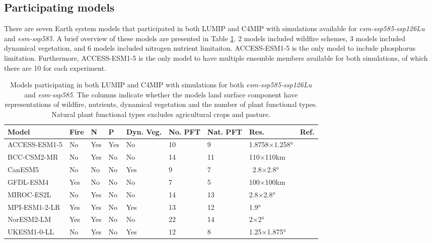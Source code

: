 \documentclass[]{article}
\begin{document}
\subsection{Participating models}

There are seven Earth system models that participated in both LUMIP and C4MIP with simulations available for \textit{esm-ssp585-ssp126Lu} and \textit{esm-ssp585}.
A brief overview of these models are presented in Table \ref{tab:models}.
2 models included wildfire schemes, 3 models included dynamical vegetation, and 6 models included nitrogen nutrient limitaiton.
ACCESS-ESM1-5 is the only model to include phosphorus limitation.
Furthermore, ACCESS-ESM1-5 is the only model to have multiple ensemble members available for both simulations, of which there are 10 for each experiment.

\begin{table}[H]
    \centering
    \begin{tabular}{lllllllll}
        \hline
Model         & Fire & N   & P   & Dyn. Veg. & No. PFT & Nat. PFT & Res. & Ref.                                         \\ \hline
ACCESS-ESM1-5 & No   & Yes & Yes & No    & 10       & 9       & 1.8758×1.258°   & \cite{ziehn_australian_2020}   \\
BCC-CSM2-MR   & No   & Yes & No  & No    & 14       & 11      & 110×110km       & \cite{li_development_2019}     \\
CanESM5       & No   & No  & No  & Yes   & 9        & 7       & ~2.8×2.8°       & \cite{swart_canadian_2019}     \\
GFDL-ESM4     & Yes  & No  & No  & No    & 7        & 5       & 100×100km       & \cite{dunne_gfdl_2020}         \\
MIROC-ES2L    & No   & Yes & No  & No    & 14       & 13      & 2.8×2.8°        & \cite{hajima_development_2020} \\
MPI-ESM1-2-LR & Yes  & Yes & No  & Yes   & 13       & 12      & 1.9°            & \cite{giorgetta_climate_2013}  \\
NorESM2-LM    & Yes  & Yes & No  & No    & 22       & 14      & 2×2°            & \cite{seland_norwegian_2020}   \\
UKESM1-0-LL   & No   & Yes & No  & Yes   & 12       & 8       & 1.25×1.875°     & \cite{sellar_ukesm1_2019}      \\ \hline
    \end{tabular}
    \caption{Models participating in both LUMIP and C4MIP with simulations for both \textit{esm-ssp585-ssp126Lu} and \textit{esm-ssp585}. The columns indicate whether the models land surface component have representations of wildfire, nutrients, dynamical vegetation and the number of plant functional types. Natural plant functional types excludes agricultural crops and pasture.}
    \label{tab:models}
\end{table}
\end{document}
